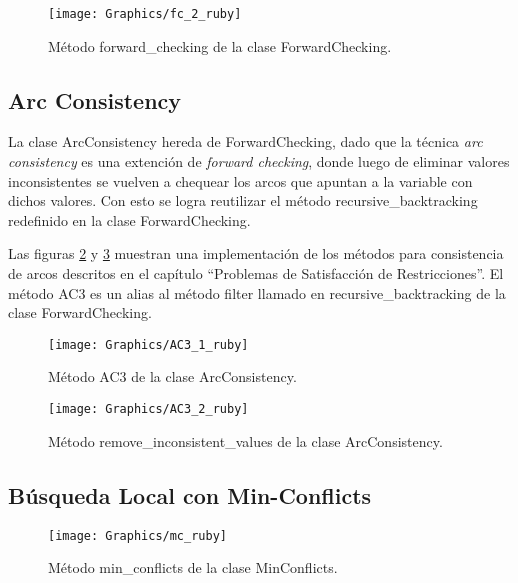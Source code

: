 \begin{figure}[h]
	\begin{center}
		\texttt{[image: Graphics/fc\_2\_ruby]}
		\caption{M\'etodo \textsf{forward\_checking} de la clase \textsf{ForwardChecking}.}
		\label{fc_2_ruby}
	\end{center}	
\end{figure}

\subsection{Arc Consistency}

La clase \textsf{ArcConsistency} hereda de \textsf{ForwardChecking}, dado que la t\'ecnica \emph{arc consistency} es una extenci\'on de \emph{forward checking}, donde luego de eliminar valores inconsistentes se vuelven a chequear los arcos que apuntan a la variable con dichos valores. Con esto se logra reutilizar el m\'etodo \textsf{recursive\_backtracking} redefinido en la clase \textsf{ForwardChecking}.

Las figuras \ref{AC3_1_ruby} y \ref{AC3_2_ruby} muestran una implementaci\'on de los m\'etodos para consistencia de arcos descritos en el cap\'itulo ``Problemas de Satisfacci\'on de Restricciones''. El m\'etodo \textsf{AC3} es un alias al m\'etodo \textsf{filter} llamado en \textsf{recursive\_backtracking} de la clase \textsf{ForwardChecking}.

\begin{figure}[h]
	\begin{center}
		\texttt{[image: Graphics/AC3\_1\_ruby]}
		\caption{M\'etodo \textsf{AC3} de la clase \textsf{ArcConsistency}.}
		\label{AC3_1_ruby}
	\end{center}	
\end{figure}

\begin{figure}[h]
	\begin{center}
		\texttt{[image: Graphics/AC3\_2\_ruby]}
		\caption{M\'etodo \textsf{remove\_inconsistent\_values} de la clase \textsf{ArcConsistency}.}
		\label{AC3_2_ruby}
	\end{center}	
\end{figure}

\subsection{B\'usqueda Local con Min-Conflicts}

\begin{figure}[h]
	\begin{center}
		\texttt{[image: Graphics/mc\_ruby]}
		\caption{M\'etodo \textsf{min\_conflicts} de la clase \textsf{MinConflicts}.}
		\label{mc_ruby}
	\end{center}	
\end{figure}